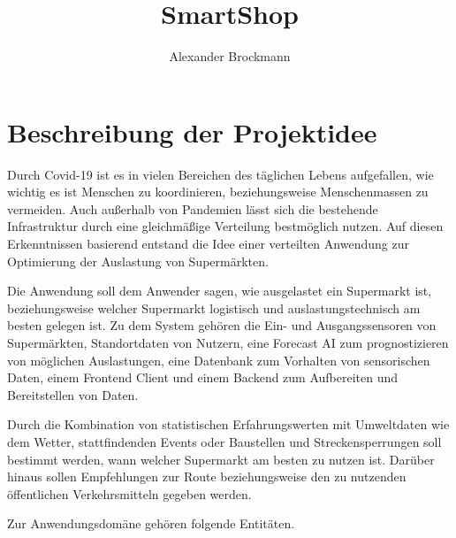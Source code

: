 \documentclass[runningheads]{llncs}
\begin{document}
%
\title{SmartShop}
%
%
\author{Alexander Brockmann}
%
%


%
\maketitle              %

\section{Beschreibung der Projektidee}
Durch Covid-19 ist es in vielen Bereichen des täglichen Lebens aufgefallen, wie wichtig es ist Menschen zu koordinieren, beziehungsweise Menschenmassen zu vermeiden.
Auch außerhalb von Pandemien lässt sich die bestehende Infrastruktur durch eine gleichmäßige Verteilung bestmöglich nutzen.
Auf diesen Erkenntnissen basierend entstand die Idee einer verteilten Anwendung zur Optimierung der Auslastung von Supermärkten.

Die Anwendung soll dem Anwender sagen, wie ausgelastet ein Supermarkt ist, beziehungsweise welcher Supermarkt logistisch und auslastungstechnisch am besten gelegen ist.
Zu dem System gehören die Ein- und Ausgangssensoren von Supermärkten, Standortdaten von Nutzern, eine Forecast AI zum prognostizieren von möglichen Auslastungen, eine Datenbank zum Vorhalten von sensorischen Daten, einem Frontend Client und einem Backend zum Aufbereiten und Bereitstellen von Daten.

Durch die Kombination von statistischen Erfahrungswerten mit Umweltdaten wie dem Wetter, stattfindenden Events oder Baustellen und Streckensperrungen soll bestimmt werden, wann welcher Supermarkt am besten zu nutzen ist.
Darüber hinaus sollen Empfehlungen zur Route beziehungsweise den zu nutzenden öffentlichen Verkehrsmitteln gegeben werden.

Zur Anwendungsdomäne gehören folgende Entitäten.
\end{document}
